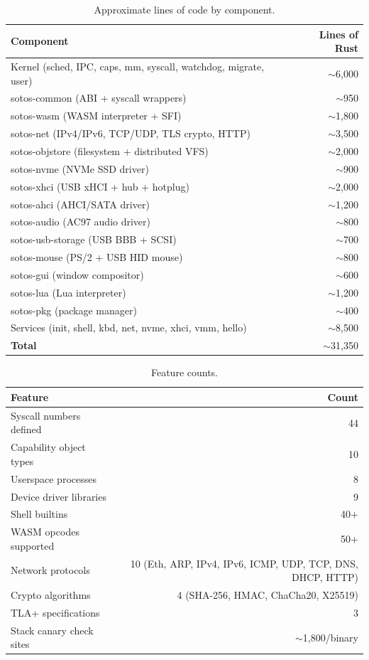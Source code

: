 \documentclass[11pt,letterpaper]{article}
\theoremstyle{definition}
\begin{document}
\begin{table}[h]
\centering
\begin{tabular}{lr}
\toprule
\textbf{Component} & \textbf{Lines of Rust} \\
\midrule
Kernel (sched, IPC, caps, mm, syscall, watchdog, migrate, user) & $\sim$6,000 \\
sotos-common (ABI + syscall wrappers) & $\sim$950 \\
sotos-wasm (WASM interpreter + SFI) & $\sim$1,800 \\
sotos-net (IPv4/IPv6, TCP/UDP, TLS crypto, HTTP) & $\sim$3,500 \\
sotos-objstore (filesystem + distributed VFS) & $\sim$2,000 \\
sotos-nvme (NVMe SSD driver) & $\sim$900 \\
sotos-xhci (USB xHCI + hub + hotplug) & $\sim$2,000 \\
sotos-ahci (AHCI/SATA driver) & $\sim$1,200 \\
sotos-audio (AC97 audio driver) & $\sim$800 \\
sotos-usb-storage (USB BBB + SCSI) & $\sim$700 \\
sotos-mouse (PS/2 + USB HID mouse) & $\sim$800 \\
sotos-gui (window compositor) & $\sim$600 \\
sotos-lua (Lua interpreter) & $\sim$1,200 \\
sotos-pkg (package manager) & $\sim$400 \\
Services (init, shell, kbd, net, nvme, xhci, vmm, hello) & $\sim$8,500 \\
\midrule
\textbf{Total} & $\sim$31,350 \\
\bottomrule
\end{tabular}
\caption{Approximate lines of code by component.}
\label{tab:loc}
\end{table}

\begin{table}[h]
\centering
\begin{tabular}{lr}
\toprule
\textbf{Feature} & \textbf{Count} \\
\midrule
Syscall numbers defined & 44 \\
Capability object types & 10 \\
Userspace processes & 8 \\
Device driver libraries & 9 \\
Shell builtins & 40+ \\
WASM opcodes supported & 50+ \\
Network protocols & 10 (Eth, ARP, IPv4, IPv6, ICMP, UDP, TCP, DNS, DHCP, HTTP) \\
Crypto algorithms & 4 (SHA-256, HMAC, ChaCha20, X25519) \\
TLA+ specifications & 3 \\
Stack canary check sites & $\sim$1,800/binary \\
\bottomrule
\end{tabular}
\caption{Feature counts.}
\label{tab:features}
\end{table}
\end{document}
